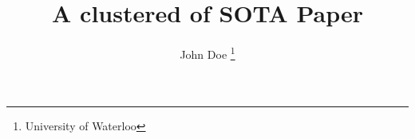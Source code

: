 \documentclass[lettersize,journal]{IEEEtran}
\begin{document}
\title{A clustered of \gls{SOTA} Paper}
\author{John Doe \thanks{University of Waterloo}}
 



\maketitle

\tableofcontents
%

\clearpage


%

\clearpage
\printglossaries    



\end{document}
